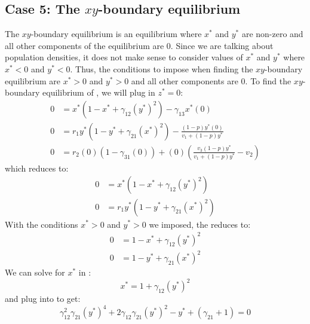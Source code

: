 \subsection{Case 5: The $xy$-boundary equilibrium}\label{subsec:xy_boundary_equilibrium}
The $xy$-boundary equilibrium is an equilibrium where $x^*$ and $y^*$ are non-zero and all other components of the equilibrium are 0. Since we are talking about population densities, it does not make sense to consider values of $x^*$ and $y^*$ where $x^*<0$ and $y^*<0$. Thus, the conditions to impose when finding the $xy$-boundary equilibrium are $x^*>0$ and $y^*>0$ and all other components are 0. To find the $xy$-boundary equilibrium of , we will plug in $z^*=0$:
\begin{align*}
    0 &= x^*\left(1-x^*+\gamma_{12}\left(y^*\right)^2\right)-\gamma_{13}x^*(0)\\
    0 &= r_1y^*\left(1-y^*+\gamma_{21}\left(x^*\right)^2\right)-\frac{\left(1-p\right)y^*(0)}{v_1+\left(1-p\right)y^*}\\
    0 &= r_2(0)\left(1-\gamma_{31}(0)\right)+(0)\left(\frac{v_3\left(1-p\right)y^*}{v_1+\left(1-p\right)y^*}-v_2\right)
\end{align*}
which reduces to:
\begin{subequations}
    \begin{align}
        0 &= x^*\left(1-x^*+\gamma_{12}\left(y^*\right)^2\right)
        \label{eq:4.5a}\\
        0 &= r_1y^*\left(1-y^*+\gamma_{21}\left(x^*\right)^2\right)
        \label{eq:4.5b}
    \end{align}
    \label{eq:4.5}
\end{subequations}
With the conditions $x^*>0$ and $y^*>0$ we imposed, the  reduces to:
\begin{subequations}
    \begin{align}
        0 &= 1-x^*+\gamma_{12}\left(y^*\right)^2
        \label{eq:4.6a}\\
        0 &= 1-y^*+\gamma_{21}\left(x^*\right)^2
        \label{eq:4.6b}
    \end{align}
    \label{eq:4.6}
\end{subequations}
We can solve for $x^*$ in :
\begin{equation}
    x^*=1+\gamma_{12}\left(y^*\right)^2
    \label{eq:4.7}
\end{equation}
and plug  into  to get:
\begin{equation}
    \gamma_{12}^2\gamma_{21}\left(y^*\right)^4+2\gamma_{12}\gamma_{21}\left(y^*\right)^2-y^*+\left(\gamma_{21}+1\right)=0
    \label{eq:4.8}
\end{equation}
